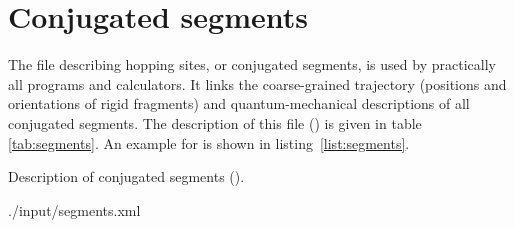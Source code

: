 \section{Conjugated segments}
\label{sec:xmlsegments}

The file describing hopping sites, or conjugated segments, is used by practically all programs and calculators. It links the coarse-grained trajectory (positions and orientations of rigid fragments) and quantum-mechanical descriptions of all conjugated segments. The description of this \xml file (\xmlsegments) is given in table \ref{tab:segments}. An example for \dcvt is shown in listing~\ref{list:segments}.

\begin{table}[h]
\caption{Description of conjugated segments (\xmlsegments).} 
\label{tab:segments}
 {\small  }
\end{table}


%
{./input/segments.xml}


